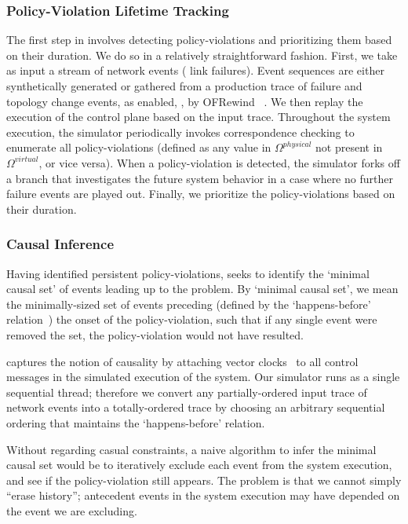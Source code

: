 \subsubsection{Policy-Violation Lifetime Tracking} The first step in
\simulator{} involves detecting policy-violations and prioritizing them based
on their duration.
We do so in a relatively straightforward fashion. First, we take as input
a stream of network events (\eg{} link failures). Event sequences are either
synthetically generated or gathered from a production trace of failure and topology change
events, as enabled, \eg{}, by OFRewind~\cite{ofrewind} .
We then replay the execution of the
control plane based on the input trace. Throughout the system execution,
the simulator periodically invokes correspondence checking to enumerate all
policy-violations (defined as any value in $\Omega^{physical}$ not present in
$\Omega^{virtual}$, or vice versa). When a policy-violation is detected,
the simulator forks off a branch that investigates the future system behavior
in a case where no further failure events are played out. Finally, we
prioritize the policy-violations based on their duration.



\subsubsection{\bf Causal Inference} Having identified persistent
policy-violations, \simulator{} seeks to identify the `minimal causal set' of
events leading up to the problem. By `minimal causal set', we mean
the minimally-sized set of events preceding (defined by the `happens-before'
relation~\cite{Lamport:1978:TCO:359545.359563}) the onset of the policy-violation, such that
if any single event were removed the set, the policy-violation would not have resulted.

\Simulator{} captures the notion of causality by attaching vector clocks~\cite{Mattern89virtualtime} to
all control messages in the simulated execution of the system. Our
simulator runs as a single sequential thread; therefore we convert any partially-ordered input trace
of network events into a totally-ordered trace by choosing an arbitrary
sequential ordering that maintains the `happens-before'
relation.

Without regarding casual constraints, a naive algorithm to infer the minimal
causal set would be to iteratively
exclude each event from the system execution, and see if the policy-violation
still appears. The problem is that we cannot simply ``erase history'';
antecedent events in the system execution may have depended on the event we
are excluding.

